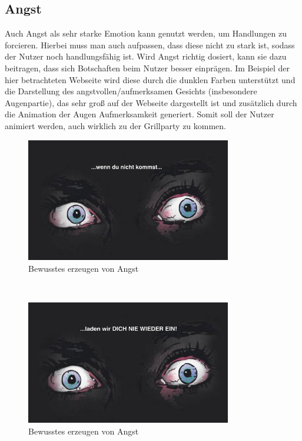 \documentclass[./dokumentation.tex]{subfiles}
\begin{document}
\subsection{Angst}
Auch Angst als sehr starke Emotion  kann genutzt werden, um Handlungen zu forcieren. Hierbei muss man auch aufpassen, dass diese nicht zu stark ist, sodass der Nutzer noch handlungsfähig ist. Wird Angst richtig dosiert, kann sie dazu beitragen, dass sich Botschaften beim Nutzer besser einprägen. Im Beispiel der hier betrachteten Webseite wird diese durch die dunklen Farben unterstützt und die Darstellung des angstvollen/aufmerksamen Gesichts (insbesondere Augenpartie), das sehr groß auf der Webseite dargestellt ist und zusätzlich durch die Animation der Augen Aufmerksamkeit generiert. Somit soll der Nutzer animiert werden, auch wirklich zu der Grillparty zu kommen.\\

\begin{figure}[h]
    \centering
    \includegraphics[width=0.8\textwidth]{bilder/angst1.png}
    \caption{Bewusstes erzeugen von Angst}
    \label{fig18:angst1}
\end{figure}\\

\begin{figure}[h]
    \centering
    \includegraphics[width=0.8\textwidth]{bilder/angst2.png}
    \caption{Bewusstes erzeugen von Angst}
    \label{fig19:angst2}
\end{figure}\\
\end{document}
